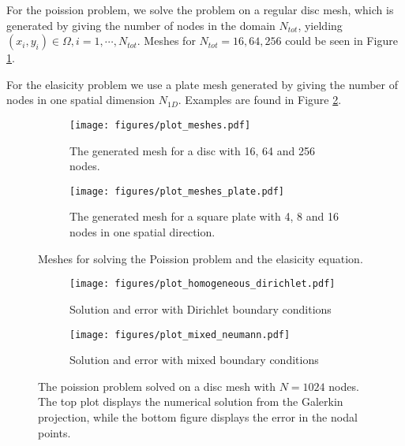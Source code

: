 \documentclass[5pt,a4paper,english]{elsarticle}%
\begin{document}
For the poission problem, we solve the problem on a regular disc mesh, which is generated by giving the number of nodes in the domain $N_{tot}$, yielding  $(x_i,y_i) \in \Omega, i = 1,\cdots,N_{tot}$. Meshes for $N_{tot} = 16,64,256$ could be seen in Figure \ref{plot-meshes}.

For the elasicity problem we use a plate mesh generated by giving the number of nodes in one spatial dimension $N_{1D}$. Examples are found in Figure \ref{plot-meshes-plate}.




\begin{figure}[ht]
    \begin{subfigure}[t]{1\textwidth}
        \centering
        \texttt{[image: figures/plot\_meshes.pdf]}
    \caption{The generated mesh for a disc with 16, 64 and 256 nodes. }
    \label{plot-meshes}
    \end{subfigure}\qquad
    \begin{subfigure}[b]{1\textwidth}
        \centering
        \texttt{[image: figures/plot\_meshes\_plate.pdf]}
    \caption{The generated mesh for a square plate with 4, 8 and 16 nodes in one spatial direction.}
    \label{plot-meshes-plate}
    \end{subfigure}
    \label{meshes}
    \caption{Meshes for solving the Poission problem and the elasicity equation.}
\end{figure}





\begin{figure}[ht]
    \begin{subfigure}[b]{0.5\textwidth}
        \centering
            \texttt{[image: figures/plot\_homogeneous\_dirichlet.pdf]}
            \caption{Solution and error with Dirichlet boundary conditions}
        \label{solution-error-dirichlet}
    \end{subfigure}\qquad
    \begin{subfigure}[b]{0.5\textwidth}
        \centering
            \texttt{[image: figures/plot\_mixed\_neumann.pdf]}
            \caption{Solution and error with mixed boundary conditions}
        \label{solution-error-mixed}
    \end{subfigure}
    \label{plot-solution-error}
    \caption{The poission problem solved on a disc mesh with $N = 1024$ nodes.
    The top plot displays the numerical solution from the Galerkin projection,
    while the bottom figure displays the error in the nodal points.}
\end{figure}
\end{document}

